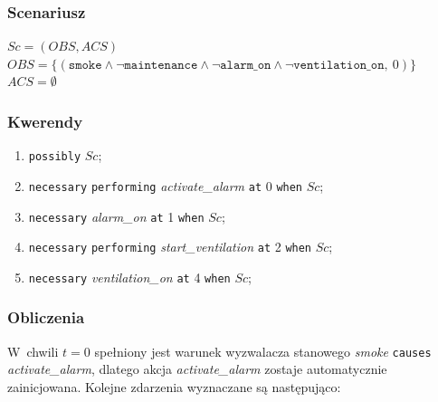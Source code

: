 \documentclass[12pt,a4paper]{article}
\newcommand{\langkw}[1]{\texttt{#1}}
\newcommand{\langvar}[1]{\textit{#1}}
\begin{document}
\subsubsection*{Scenariusz}

\noindent
$Sc = (OBS, ACS)$\\
$OBS = \{(\texttt{smoke} \land \neg \texttt{maintenance} \land \neg \texttt{alarm\_on} \land \neg \texttt{ventilation\_on},\ 0)\}$\\
$ACS = \emptyset$

\subsubsection*{Kwerendy}

\begin{enumerate}[label=\arabic*.]
    \item \langkw{possibly} $Sc$;
    \item \langkw{necessary} \langkw{performing} \langvar{activate\_alarm} \langkw{at} 0 \langkw{when} $Sc$;
    \item \langkw{necessary} \langvar{alarm\_on} \langkw{at} 1 \langkw{when} $Sc$;
    \item \langkw{necessary} \langkw{performing} \langvar{start\_ventilation} \langkw{at} 2 \langkw{when} $Sc$;
    \item \langkw{necessary} \langvar{ventilation\_on} \langkw{at} 4 \langkw{when} $Sc$;
\end{enumerate}

\subsubsection*{Obliczenia}

W~chwili $t=0$ spełniony jest warunek wyzwalacza stanowego \langvar{smoke} \langkw{causes} \langvar{activate\_alarm}, dlatego akcja \langvar{activate\_alarm} zostaje automatycznie zainicjowana. Kolejne zdarzenia wyznaczane są następująco:
\end{document}
